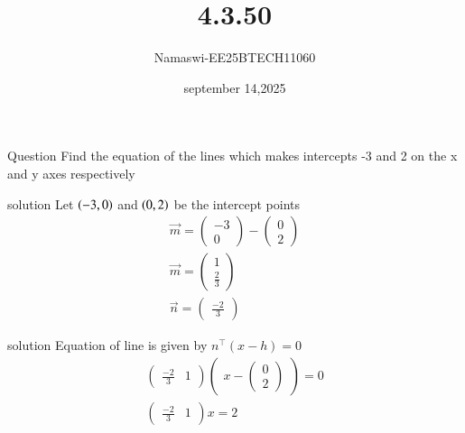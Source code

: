 \documentclass{beamer}
\begin{document}
\title 
{4.3.50}
\date{september 14,2025}


\author 
{Namaswi-EE25BTECH11060}
\frame{\titlepage}
\begin{frame}{Question}
Find the equation of the lines which makes intercepts -3 and 2 on the x and y axes respectively
\end{frame}
\begin{frame}{solution}
 Let $\left(-3,0\right)$  and  $\left(0,2\right)$  be the intercept points\\
\begin{align}
\Vec{m}=\begin{pmatrix}
    -3 \\ 0
\end{pmatrix}-\begin{pmatrix}
    0  \\  2
\end{pmatrix}\\
\Vec{m}=\begin{pmatrix}
    1 \\ \frac{2}{3}
\end{pmatrix}\\
\Vec{n}=\begin{pmatrix}
    \frac{-2}{3} 
\end{pmatrix}
\end{align}
\end{frame}

\begin{frame}{solution}
 Equation \; of \;line \;is\; given by $n^\top(x-h)=0$
\begin{align}
\begin{pmatrix}
    \frac{-2}{3} & 1
\end{pmatrix}\begin{pmatrix}
    x - \begin{pmatrix}
        0 \\ 2
    \end{pmatrix}
\end{pmatrix}=0\\
\begin{pmatrix}
    \frac{-2}{3} & 1
\end{pmatrix}x=2
\end{align}
\end{frame}
 
\end{document}
